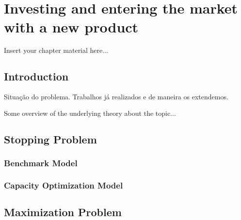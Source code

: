 
\chapter{Investing and entering the market with a new product}
\label{chapter:background}

Insert your chapter material here...


\section{Introduction}
\label{section:overview}

Situação do problema.
Trabalhos já realizados e de maneira os extendemos.

Some overview of the underlying theory about the topic...


\section{Stopping Problem}
\label{section:theory1}



\subsection{Benchmark Model}

\subsection{Capacity Optimization Model}




\section{Maximization Problem}
\label{prob1max}


